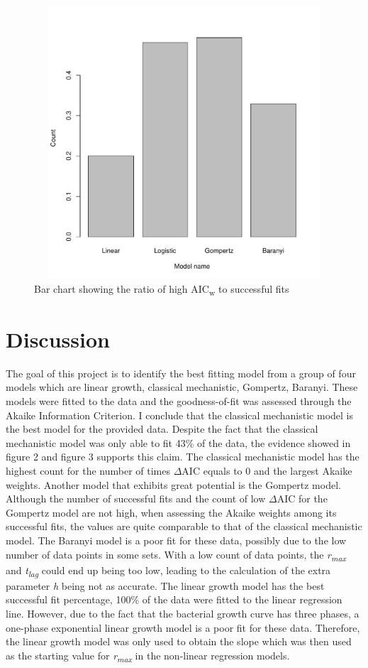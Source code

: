 \documentclass[11pt]{article}
\begin{document}
\begin{figure}[H]
\includegraphics[keepaspectratio, width = 5in, height = 4in]{../results/ratio.pdf}
\centering
\caption{Bar chart showing the ratio of high {AIC\textsubscript{w}} to successful fits}
\end{figure}
\newpage
\section{Discussion}
The goal of this project is to identify the best fitting model from a group of four models which are linear growth, classical mechanistic, Gompertz, Baranyi. These models were fitted to the data and the goodness-of-fit was assessed through the Akaike Information Criterion. I conclude that the classical mechanistic model is the best model for the provided data. Despite the fact that the classical mechanistic model was only able to fit 43\% of the data, the evidence showed in figure 2 and figure 3 supports this claim. The classical mechanistic model has the highest count for the number of times {$\Delta$AIC} equals to 0 and the largest Akaike weights. Another model that exhibits great potential is the Gompertz model. Although the number of successful fits and the count of low {$\Delta$AIC} for the Gompertz model are not high, when assessing the Akaike weights among its successful fits, the values are quite comparable to that of the classical mechanistic model. The Baranyi model is a poor fit for these data, possibly due to the low number of data points in some sets. With a low count of data points, the \emph{r\textsubscript{max}} and \emph{t\textsubscript{lag}} could end up being too low, leading to the calculation of the extra parameter \emph{h} being not as accurate. The linear growth model has the best successful fit percentage, 100\% of the data were fitted to the linear regression line. However, due to the fact that the bacterial growth curve has three phases, a one-phase exponential linear growth model is a poor fit for these data. Therefore, the linear growth model was only used to obtain the slope which was then used as the starting value for \emph{r\textsubscript{max}} in the non-linear regression models. 
\newpage
\end{document}
